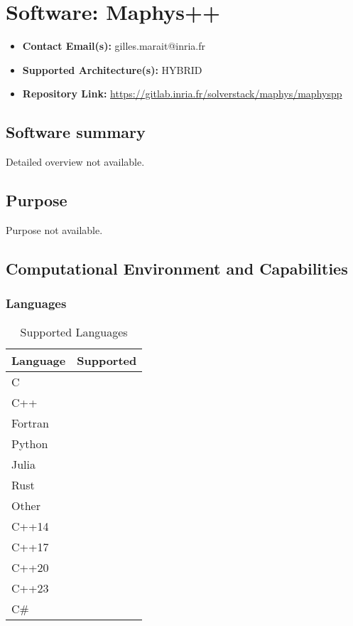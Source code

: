 \section{Software: Maphys++}
\label{sec:Maphys++:software}



\begin{itemize}
    \item \textbf{Contact Email(s):} gilles.marait@inria.fr
    \item \textbf{Supported Architecture(s):} HYBRID
    \item \textbf{Repository Link:} \href{https://gitlab.inria.fr/solverstack/maphys/maphyspp}{https://gitlab.inria.fr/solverstack/maphys/maphyspp}
\end{itemize}

\subsection{Software summary}
\label{sec:Maphys++:summary}
Detailed overview not available.



\subsection{Purpose}
\label{sec:Maphys++:purpose}
Purpose not available.

\subsection{Computational Environment and Capabilities}
\label{sec:::environment_capabilities}

\subsubsection{Languages}
\begin{table}[h!]
    \centering
    \begin{tabular}{|l|c|}
        \hline
        Language & Supported \\
        \hline
        C &  \\
        C++ &  \\
        Fortran &  \\
        Python &  \\
        Julia &  \\
        Rust &  \\
        Other &  \\
        C++14 &  \\
        C++17 &  \\
        C++20 &  \\
        C++23 &  \\
        C# &  \\
        \hline
    \end{tabular}
    \caption{Supported Languages}
\end{table}

